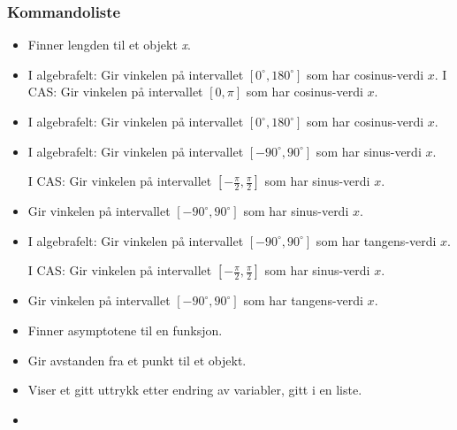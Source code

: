 \subsubsection{Kommandoliste}
\begin{itemize}
\item {}
{Finner lengden til et objekt \textit{x}.
}

\item {}
{
I algebrafelt: Gir vinkelen på intervallet $ [0^\circ, 180^\circ] $ som har cosinus-verdi $ x $. \os
I CAS: Gir vinkelen på intervallet $ [0, \pi] $ som har cosinus-verdi $ x $.
}

\item {}
{
	I algebrafelt: Gir vinkelen på intervallet $ [0^\circ, 180^\circ] $ som har cosinus-verdi $ x $.
}

\item {}
{
I algebrafelt: Gir vinkelen på intervallet $ [-90^\circ, 90^\circ] $ som har sinus-verdi $ x $.\os

I CAS: Gir vinkelen på intervallet $ [-\frac{\pi}{2}, \frac{\pi}{2}] $ som har sinus-verdi $ x $.
}

\item {}
{
Gir vinkelen på intervallet $ [-90^\circ, 90^\circ] $ som har sinus-verdi $ x $.
}

\item {}
{
I algebrafelt: Gir vinkelen på intervallet $ [-90^\circ, 90^\circ] $ som har tangens-verdi $ x $.\os

I CAS: Gir vinkelen på intervallet $ [-\frac{\pi}{2}, \frac{\pi}{2}] $ som har sinus-verdi $ x $.
}

\item {}
{
Gir vinkelen på intervallet $ [-90^\circ, 90^\circ] $ som har tangens-verdi $ x $.
}


\item {}
{Finner asymptotene til en funksjon.}



\item {}
{Gir avstanden fra et punkt til et objekt.}

\item {}
{Viser et gitt uttrykk etter endring av variabler, gitt i en liste.}

\item {}


\end{itemize}
